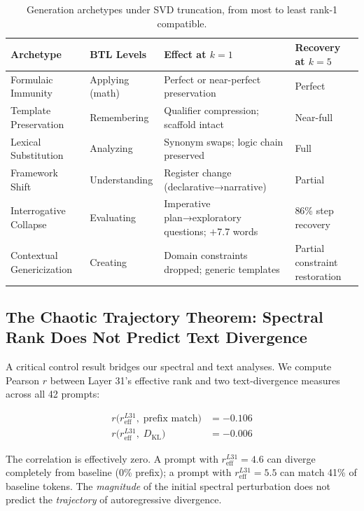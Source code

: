 \begin{table}[h]
\centering
\caption{Generation archetypes under SVD truncation, from most to least rank-1 compatible.}
\label{tab:archetypes}
\begin{tabular}{lp{3.2cm}p{3.5cm}p{2.8cm}}
\toprule
\textbf{Archetype} & \textbf{BTL Levels} & \textbf{Effect at $k=1$} & \textbf{Recovery at $k=5$} \\
\midrule
Formulaic Immunity   & Applying (math)        & Perfect or near-perfect preservation & Perfect \\
Template Preservation & Remembering            & Qualifier compression; scaffold intact & Near-full \\
Lexical Substitution  & Analyzing              & Synonym swaps; logic chain preserved & Full \\
Framework Shift       & Understanding          & Register change (declarative→narrative) & Partial \\
Interrogative Collapse & Evaluating            & Imperative plan→exploratory questions; $+$7.7 words & 86\% step recovery \\
Contextual Genericization & Creating           & Domain constraints dropped; generic templates & Partial constraint restoration \\
\bottomrule
\end{tabular}
\end{table}

\subsection{The Chaotic Trajectory Theorem: Spectral Rank Does Not Predict Text Divergence}

A critical control result bridges our spectral and text analyses.
We compute Pearson $r$ between Layer 31's effective rank and two text-divergence
measures across all 42 prompts:

\begin{align}
    r\bigl(r_\mathrm{eff}^{L31},\; \text{prefix match}\bigr) &= -0.106 \\
    r\bigl(r_\mathrm{eff}^{L31},\; D_\mathrm{KL}\bigr)       &= -0.006
\end{align}

The correlation is effectively zero.
A prompt with $r_\mathrm{eff}^{L31} = 4.6$ can diverge completely from baseline (0\% prefix);
a prompt with $r_\mathrm{eff}^{L31} = 5.5$ can match 41\% of baseline tokens.
The \emph{magnitude} of the initial spectral perturbation does not predict the
\emph{trajectory} of autoregressive divergence.

